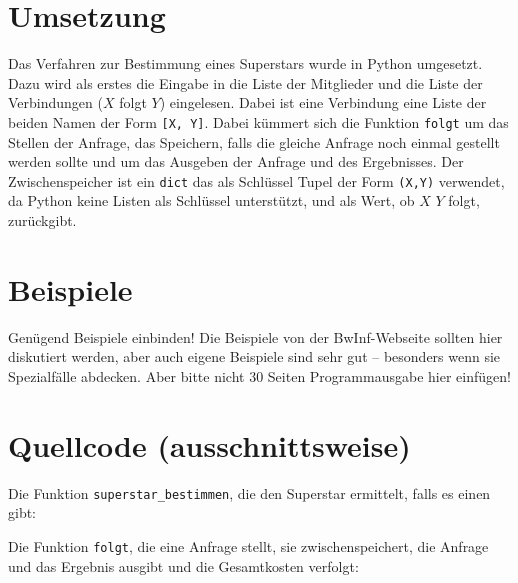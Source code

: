 \documentclass[a4paper,10pt,ngerman]{scrartcl}
\begin{document}
\section{Umsetzung}
Das Verfahren zur Bestimmung eines Superstars wurde in Python umgesetzt.\newline
Dazu wird als erstes die Eingabe in die Liste der Mitglieder und die Liste der Verbindungen
($X$ folgt $Y$) eingelesen. Dabei ist eine Verbindung eine Liste der beiden Namen der Form
\texttt{[X, Y]}. Dabei kümmert sich die Funktion \texttt{folgt} um das Stellen der Anfrage,
das Speichern, falls die gleiche Anfrage noch einmal gestellt werden sollte und um das Ausgeben
der Anfrage und des Ergebnisses. Der Zwischenspeicher ist ein \texttt{dict} das als Schlüssel
Tupel der Form \texttt{(X,Y)} verwendet, da Python keine Listen als Schlüssel unterstützt,
und als Wert, ob $X$ $Y$ folgt, zurückgibt. 

\section{Beispiele}
Genügend Beispiele einbinden! Die Beispiele von der BwInf-Webseite sollten hier diskutiert werden, aber auch eigene Beispiele sind sehr gut – besonders wenn sie Spezialfälle abdecken. Aber bitte nicht 30 Seiten Programmausgabe hier einfügen!

\clearpage

\section{Quellcode (ausschnittsweise)}

Die Funktion \texttt{superstar\_bestimmen}, die den Superstar ermittelt,
falls es einen gibt:


\vspace{30pt}

Die Funktion \texttt{folgt}, die eine Anfrage stellt, sie zwischenspeichert,
die Anfrage und das Ergebnis ausgibt und die Gesamtkosten verfolgt:

\end{document}
